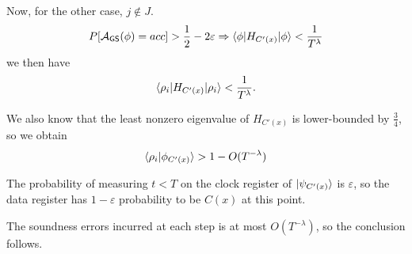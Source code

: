 \begin{prf}
	Now, for the other case, $j\notin J$.
	$$P[\mathcal{A}_{\mathsf{GS}}(\phi)=acc]>\frac{1}{2}-2\varepsilon\Rightarrow\braket{\phi|H_{C'(x)}|\phi}<\frac{1}{T^\lambda}$$
	we then have
	$$\braket{\rho_i|H_{C'(x)}|\rho_i}<\frac{1}{T^\lambda}.$$

	We also know that the least nonzero eigenvalue of $H_{C'(x)}$ is lower-bounded by $\frac{3}{4}$, so we obtain 
	$$\braket{\rho_i|\phi_{C'(x)}}>1-O(T^{-\lambda})$$

	The probability of measuring $t<T$ on the clock register of $\ket{\psi_{C'(x)}}$ is $\varepsilon$,
	so the data register has $1-\varepsilon$ probability to be $C(x)$ at this point.

	The soundness errors incurred at each step is at most $O(T^{-\lambda})$, so the conclusion follows.
\end{prf}

